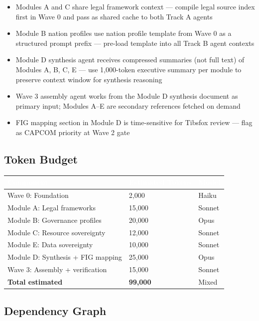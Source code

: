 \documentclass[11pt,letterpaper]{article}
\newcommand{\tableheader}[1]{\textbf{\sffamily\textcolor{white}{#1}}}
\begin{document}
\begin{itemize}
  \item Modules A and C share legal framework context --- compile legal source index first in Wave 0 and pass as shared cache to both Track A agents
  \item Module B nation profiles use nation profile template from Wave 0 as a structured prompt prefix --- pre-load template into all Track B agent contexts
  \item Module D synthesis agent receives compressed summaries (not full text) of Modules A, B, C, E --- use 1,000-token executive summary per module to preserve context window for synthesis reasoning
  \item Wave 3 assembly agent works from the Module D synthesis document as primary input; Modules A--E are secondary references fetched on demand
  \item FIG mapping section in Module D is time-sensitive for Tibsfox review --- flag as CAPCOM priority at Wave 2 gate
\end{itemize}

\subsection{Token Budget}

\begin{center}
\begin{tabularx}{\textwidth}{L{4cm}C{3cm}C{3cm}}
\toprule
{}
\tableheader{Component} & \tableheader{Estimated Tokens} & \tableheader{Model} \\
\midrule
Wave 0: Foundation & 2,000 & Haiku \\
Module A: Legal frameworks & 15,000 & Sonnet \\
Module B: Governance profiles & 20,000 & Opus \\
Module C: Resource sovereignty & 12,000 & Sonnet \\
Module E: Data sovereignty & 10,000 & Sonnet \\
Module D: Synthesis + FIG mapping & 25,000 & Opus \\
Wave 3: Assembly + verification & 15,000 & Sonnet \\
\midrule
\textbf{Total estimated} & \textbf{99,000} & Mixed \\
\bottomrule
\end{tabularx}
\end{center}

\subsection{Dependency Graph}
\end{document}
